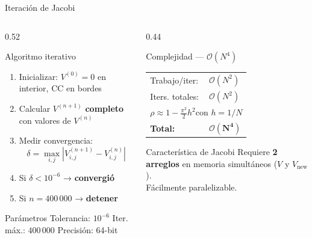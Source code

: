 \documentclass[aspectratio=169, 11pt]{beamer}
\begin{document}
\begin{frame}{Iteración de Jacobi}
  \begin{columns}[T]
    \begin{column}{0.52\textwidth}
      \begin{block}{Algoritmo iterativo}
        \begin{enumerate}
          \item Inicializar: $V^{(0)}=0$ en interior, CC en bordes
          \item Calcular $V^{(n+1)}$ \textbf{completo} con valores de $V^{(n)}$
          \item Medir convergencia:
          \[
            \delta = \max_{i,j}\left|V_{i,j}^{(n+1)} - V_{i,j}^{(n)}\right|
          \]
          \item Si $\delta < 10^{-6}$ → \textcolor{verdek}{\textbf{convergió}}
          \item Si $n=400\,000$ → \textcolor{rojok}{\textbf{detener}}
        \end{enumerate}
      \end{block}
      \vspace{0.2cm}
      \begin{exampleblock}{Parámetros}
        Tolerancia: $10^{-6}$ \quad Iter. máx.: $400\,000$ \quad Precisión: 64-bit
      \end{exampleblock}
    \end{column}
    \begin{column}{0.44\textwidth}
      \begin{alertblock}{Complejidad — $\mathcal{O}(N^4)$}
        \begin{tabular}{ll}
          Trabajo/iter:   & $\mathcal{O}(N^2)$ \\[0.2cm]
          Iters. totales: & $\mathcal{O}(N^2)$ \\[0.1cm]
          \multicolumn{2}{l}{\small $\rho \approx 1-\frac{\pi^2}{2}h^2$\quad con $h=1/N$} \\[0.2cm]
          \textbf{Total:} & $\boldsymbol{\mathcal{O}(N^4)}$ \\
        \end{tabular}
      \end{alertblock}
      \vspace{0.3cm}
      \begin{block}{Característica de Jacobi}
        Requiere \textbf{2 arreglos} en memoria simultáneos ($V$ y $V_\text{new}$).\\[0.15cm]
        Fácilmente paralelizable.
      \end{block}
    \end{column}
  \end{columns}
\end{frame}
\end{document}
